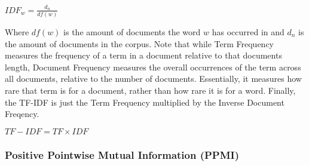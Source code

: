 $IDF_{w} =  \frac{d_n}{{df}(w)} $

Where ${df}(w)$ is the amount of documents the word $w$ has occurred in and $d_n$ is the amount of documents in the corpus. Note that while Term Frequency measures the frequency of a term in a document relative to that documents length, Document Frequency measures the overall occurrences of the term across all documents, relative to the number of documents. Essentially, it measures how rare that term is for a document, rather than how rare it is for a word. Finally, the TF-IDF is just the Term Frequency multiplied by the Inverse Document Freqency.

${TF-IDF} = TF \times IDF$

\subsubsection{Positive Pointwise Mutual Information (PPMI)}









